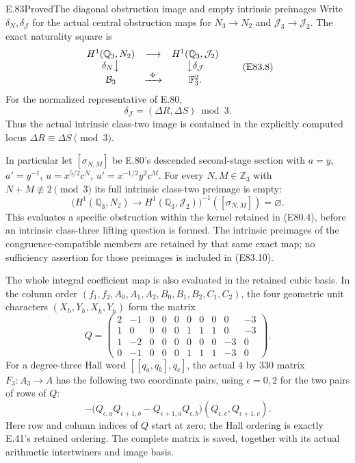 \begin{statement}{E.83}{Proved}{The diagonal obstruction image and empty intrinsic preimages}
Write $\delta_N,\delta_{\mathcal J}$ for the actual
central obstruction maps for $N_3\to N_2$ and
$\mathcal J_3\to\mathcal J_2$. The exact naturality
square is
\[
 \begin{array}{ccc}
 H^1(\mathbb Q_3,N_2)&\longrightarrow&H^1(\mathbb Q_3,\mathcal J_2)\\
 \delta_N\big\downarrow&&\big\downarrow\delta_{\mathcal J}\\
 \mathcal B_3&\xrightarrow{\ \Phi\ }&\mathbb F_3^2.
 \end{array}
 \tag{E83.8}
\]
For the normalized representative of E.80,
\[
       \delta_{\mathcal J}=(\Delta R,\Delta S)\bmod3.
 \tag{E83.9}
\]
Thus the actual intrinsic class-two image is
contained in the explicitly computed locus
$\Delta R\equiv\Delta S\pmod3$.

In particular let $[\sigma_{N,M}]$ be E.80's
descended second-stage section with
$a=y$, $a'=y^{-1}$,
$u=x^{5/2}c^N$, $u'=x^{-1/2}y^2c^M$.
For every $N,M\in\mathbb Z_3$ with
$N+M\not\equiv2\pmod3$ its full intrinsic
class-two preimage is empty:
\[
 \bigl(H^1(\mathbb Q_3,N_2)
          \longrightarrow H^1(\mathbb Q_3,\mathcal J_2)\bigr)^{-1}
                    ([\sigma_{N,M}])=\varnothing.
 \tag{E83.10}
\]
This evaluates a specific obstruction within the
kernel retained in (E80.4), before an intrinsic
class-three lifting question is formed. The
intrinsic preimages of the congruence-compatible
members are retained by that same exact map;
no sufficiency assertion for those preimages is
included in (E83.10).

The whole integral coefficient map is also
evaluated in the retained cubic basis. In the
column order $(f_1,f_2,A_0,A_1,A_2,B_0,B_1,B_2,C_1,C_2)$,
the four geometric unit characters
$(X_h,Y_h,X_{\bar h},Y_{\bar h})$ form the matrix
\[
 Q=\begin{pmatrix}
 2&-1&0&0&0&0&0&0&0&-3\\
 1&0&0&0&0&1&1&1&0&-3\\
 1&-2&0&0&0&0&0&0&-3&0\\
 0&-1&0&0&0&1&1&1&-3&0
 \end{pmatrix}.
 \tag{E83.11}
\]
For a degree-three Hall word $[[q_a,q_b],q_c]$,
the actual $4$ by $330$ matrix $F_3:A_3\to A$
has the following two coordinate pairs, using
$\epsilon=0,2$ for the two pairs of rows of $Q$:
\[
 -\bigl(Q_{\epsilon,a}Q_{\epsilon+1,b}
         -Q_{\epsilon+1,a}Q_{\epsilon,b}\bigr)
           (Q_{\epsilon,c},Q_{\epsilon+1,c}).
 \tag{E83.12}
\]
Here row and column indices of $Q$ start at zero; the Hall
ordering is exactly E.41's retained ordering.
The complete matrix is saved, together with its
actual arithmetic intertwiners and image basis.


\end{statement}

